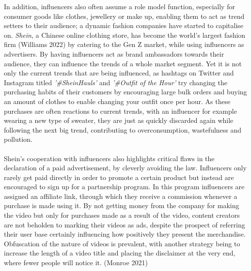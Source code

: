 \documentclass{article}
\begin{document}
	In addition, influencers also often assume a role model function, especially for consumer goods like clothes, jewellery or make up, enabling them to act as trend setters to their audience; a dynamic fashion companies have started to capitalise on. \textit{Shein}, a Chinese online clothing store, has become the world's largest fashion firm (Williams 2022) by catering to the Gen Z market, while using influencers as advertisers. By having influencers act as brand ambassadors towards their audience, they can influence the trends of a whole market segment. Yet it is not only the current trends that are being influenced, as hashtags on Twitter and Instagram titled \textit{'\#SheinHauls'} and \textit{'\#Outfit of the Hour'} try changing the purchasing habits of their customers by encouraging large bulk orders and buying an amount of clothes to enable changing your outfit once per hour. As these purchases are often reactions to current trends, with an influencer for example wearing a new type of sweater, they are just as quickly discarded again while following the next big trend, contributing to overconsumption, wastefulness and pollution. \\ \\

	Shein's cooperation with influencers also highlights critical flaws in the declaration of a paid advertisement, by cleverly avoiding the law. Influencers only rarely get paid directly in order to promote a certain product but instead are encouraged to sign up for a partnership program. In this program influencers are assigned an affiliate link, through which they receive a commission whenever a purchase is made using it. By not getting money from the company for making the video but only for purchases made as a result of the video, content creators are not beholden to marking their videos as ads, despite the prospect of referring their user base certainly influencing how positively they present the merchandise. Obfuscation of the nature of videos is prevalent, with another strategy being to increase the length of a video title and placing the disclaimer at the very end, where fewer people will notice it. (Monroe 2021) \\ \\
\end{document}
